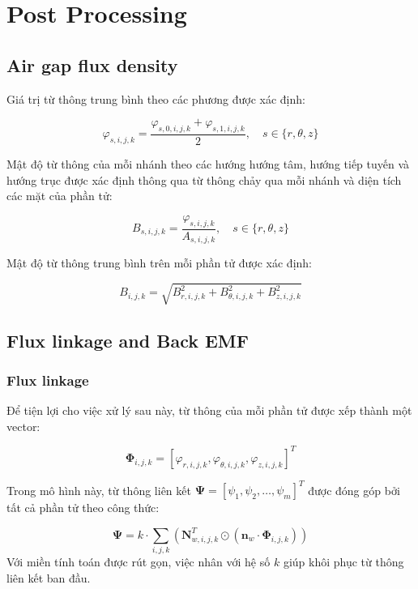 \section{Post Processing}
\subsection{Air gap flux density}
Giá trị từ thông trung bình theo các phương được xác định:

\begin{equation}
\varphi_{s,i,j,k} = \frac{\varphi_{s,0,i,j,k} + \varphi_{s,1,i,j,k}}{2}, \quad s \in \{r, \theta, z\}
\end{equation}




Mật độ từ thông của mỗi nhánh theo các hướng hướng tâm, hướng tiếp tuyến và hướng trục được xác định thông qua từ thông chảy qua mỗi nhánh và diện tích các mặt của phần tử: 

\begin{equation}
    B_{s,i,j,k} = \frac{\varphi_{s,i,j,k}}{A_{s,i,j,k}} , \quad s \in \{r, \theta, z\}
\end{equation}

Mật độ từ thông trung bình trên mỗi phần tử được xác định:

\begin{equation}
B_{i,j,k} = \sqrt{B_{r,i,j,k}^2 +B_{\theta,i,j,k}^2 + B_{z,i,j,k}^2 }
\end{equation}

\subsection{Flux linkage and Back EMF}
\subsubsection{Flux linkage}
Để tiện lợi cho việc xử lý sau này, từ thông của mỗi phần tử được xếp thành một vector: 

\begin{equation}
\mathbf{\Phi}_{i,j,k} = [\varphi_{r,i,j,k},\varphi_{\theta,i,j,k},\varphi_{z,i,j,k}]^T
\end{equation}




Trong mô hình này, từ thông liên kết $\mathbf{\Psi} = [\psi_1, \psi_2,\dots,\psi_m]^T$ được đóng góp bởi tất cả phần tử theo công thức: 

\begin{equation}
\mathbf{\Psi} = k \cdot \sum_{i,j,k} \left( \mathbf{N}_{w,i,j,k}^T \odot (\mathbf{n}_w  \cdot \mathbf{\Phi}_{i,j,k}) \right)
\end{equation}
Với miền tính toán được rút gọn, việc nhân với hệ số $k$ giúp khôi phục từ thông liên kết ban đầu.
